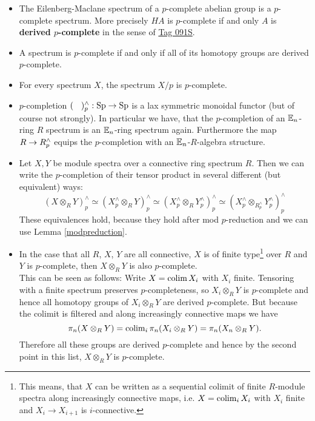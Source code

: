 \begin{itemize}
    \item The Eilenberg-Maclane spectrum of a $p$-complete abelian group is a $p$-complete spectrum. More precisely $HA$ is $p$-complete if and only $A$ is \textbf{derived $p$-complete} in the sense of \href{https://stacks.math.columbia.edu/tag/091S}{Tag 091S}.
    \item A spectrum is $p$-complete if and only if all of its homotopy groups are derived $p$-complete.
    \item For every spectrum $X$, the spectrum $X/p$ is $p$-complete.
    \item $p$-completion $(\phantom{X})^{\wedge}_p:\operatorname{Sp}\to\operatorname{Sp}$ is a lax symmetric monoidal functor (but of course not strongly).
    In particular we have, that the $p$-completion of an $\mathbb{E}_n$-ring $R$ spectrum is an $\mathbb{E}_n$-ring spectrum again. Furthermore the map $R\rightarrow R_p^{\wedge}$ equips the $p$-completion with an $\mathbb{E}_n$-$R$-algebra structure.
    \item Let $X,Y$ be module spectra over a connective ring spectrum $R$. Then we can write the $p$-completion of their tensor product in several different (but equivalent) ways:
    \begin{equation*}
        \left( X\otimes_R Y \right)_p^{\wedge}\simeq\left( X_p^{\wedge}\otimes_R Y \right)_p^{\wedge} \simeq\left( X_p^{\wedge}\otimes_R Y_p^{\wedge} \right)_p^{\wedge} \simeq\left( X_p^{\wedge}\otimes_{R_p^{\wedge}} Y_p^{\wedge} \right)_p^{\wedge} 
    \end{equation*}
    These equivalences hold, because they hold after mod $p$-reduction and we can use Lemma \ref{modpreduction}.
    \item In the case that all $R$, $X$, $Y$ are all connective, $X$ is of finite type\footnote{This means, that $X$ can be written as a sequential colimit of finite $R$-module spectra along increasingly connective maps, i.e. $X=\operatorname{colim}_i X_i$ with $X_i$ finite and $X_i\to X_{i+1}$ is $i$-connective.} over $R$ and $Y$ is $p$-complete, then $X\otimes_R Y$ is also $p$-complete. \\
    This can be seen as follows: Write $X=\operatorname{colim} X_i$ with $X_i$ finite. Tensoring with a finite spectrum preserves $p$-completeness, so $X_i\otimes_R Y$ is $p$-complete and hence all homotopy groups of $X_i\otimes_R Y$ are derived $p$-complete. But because the colimit is filtered and along increasingly connective maps we have
    \begin{equation*}
        \pi_n(X\otimes_R Y)=\operatorname{colim}_i \pi_n(X_i\otimes_R Y)=\pi_n(X_n\otimes_R Y).
    \end{equation*}
    Therefore all these groups are derived $p$-complete and hence by the second point in this list, $X\otimes_R Y$ is $p$-complete.
\end{itemize}
